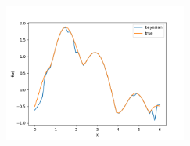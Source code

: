 \documentclass{article}
\begin{document}
\begin{figure}[!ht]
    \centering
    \includegraphics[width=6cm]{cbo_2.png}
\end{figure}
\end{document}
